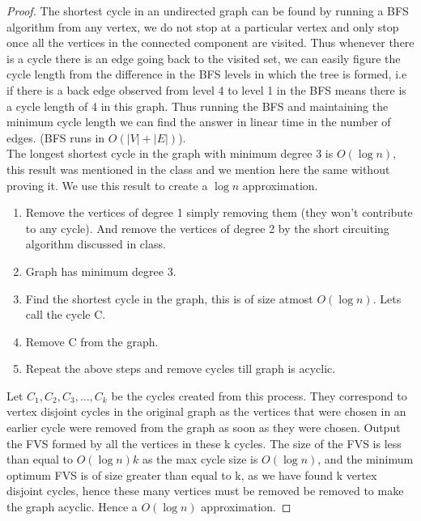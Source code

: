 \documentclass[solution,addpoints,12pt]{exam}
\begin{document}
\begin{questions}
\begin{parts}
 \begin{solution}
  \begin{proof}
  The shortest cycle in an undirected graph can be found by running a BFS algorithm from any vertex, we do not stop at a particular vertex and only stop once all the vertices in the connected component are visited. Thus whenever there is a cycle there is an edge going back to the visited set, we can easily figure the cycle length from the difference in the BFS levels in which the tree is formed, i.e if there is a back edge observed from level 4 to level 1 in the BFS means there is a cycle length of 4 in this graph. Thus running the BFS and maintaining the minimum cycle length we can find the answer in linear time in the number of edges. (BFS runs in $O(|V|+|E|)$).
  \\
  The longest shortest cycle in the graph with minimum degree 3 is $O(\log n)$, this result was mentioned in the class and we mention here the same without proving it. We use this result to create a $\log n$ approximation. 
\\ 
\begin{enumerate}
\item Remove the vertices of degree 1 simply removing them (they won't contribute to any cycle). And remove the vertices of degree 2 by the short circuiting algorithm discussed in class.
\item Graph has minimum degree 3.
\item Find the shortest cycle in the graph, this is of size atmost $O(\log n)$. Lets call the cycle C.
\item Remove C from the graph. 
\item Repeat the above steps and remove cycles till graph is acyclic.
\end{enumerate}
Let $C_1,C_2,C_3,\ldots,C_k$ be the cycles created from this process. They correspond to vertex disjoint cycles in the original graph as the vertices that were chosen in an earlier cycle were removed from the graph as soon as they were chosen. Output the FVS formed by all the vertices in these k cycles. The size of the FVS is less than equal to $O(\log n)k$ as the max cycle size is $O(\log n)$, and the minimum optimum FVS is of size greater than equal to k, as we have found k vertex disjoint cycles, hence these many vertices must be removed be removed to make the graph acyclic. Hence a $O(\log n)$ approximation.
  \end{proof}
  \end{solution}
  \end{parts}

\end{questions}
\end{document}
